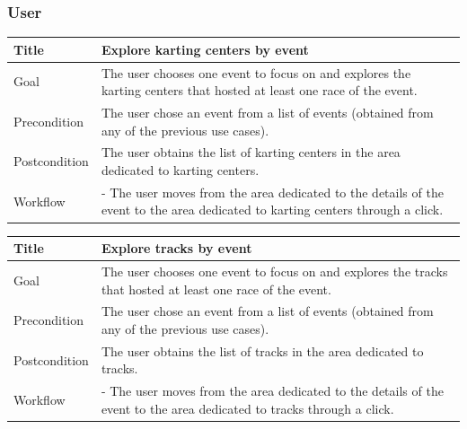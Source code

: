 \documentclass{beamer}
\begin{document}
\begin{frame}
    \frametitle{User}
    \begin{table}
        \tiny
        \begin{tabular}{|p{2cm}|p{6cm}|}
        \hline
        Title & \textbf{Explore karting centers by event} \\
        \hline
        Goal & The user chooses one event to focus on and explores the karting centers that hosted at least
        one race of the event. \\
        \hline
        Precondition & The user chose an event from a list of events (obtained from any of the previous use cases).\\
        \hline
        Postcondition & The user obtains the list of karting centers in the area dedicated to karting centers. \\
        \hline
        Workflow &
        - The user moves from the area dedicated to the details of the event to the
        area dedicated to karting centers through a click. \\
        \hline
        \end{tabular}
\end{table}

\begin{table}
    \tiny
    \begin{tabular}{|p{2cm}|p{6cm}|}
    \hline
    Title & \textbf{Explore tracks by event} \\
    \hline
    Goal & The user chooses one event to focus on and explores the tracks that hosted at least
    one race of the event. \\
    \hline
    Precondition & The user chose an event from a list of events (obtained from any of the previous use cases).\\
    \hline
    Postcondition & The user obtains the list of tracks in the area dedicated to tracks. \\
    \hline
    Workflow &
    - The user moves from the area dedicated to the details of the event to the
    area dedicated to tracks through a click. \\
    \hline
    \end{tabular}
\end{table}
\end{frame}


\end{document}
